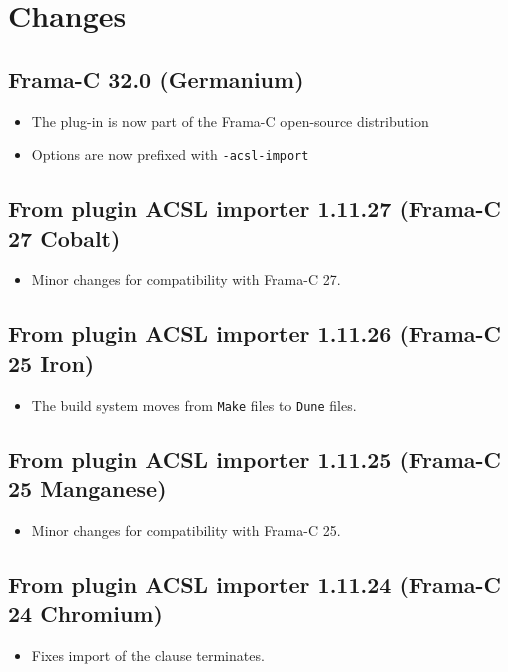 \chapter*{Changes}


\section*{Frama-C 32.0 (Germanium)}
\begin{itemize}
\item The plug-in is now part of the Frama-C open-source distribution
\item Options are now prefixed with \verb|-acsl-import|
\end{itemize}

\section*{From plugin ACSL importer 1.11.27 (Frama-C 27 Cobalt)}
\begin{itemize}
\item Minor changes for compatibility with Frama-C 27.
\end{itemize}

\section*{From plugin ACSL importer 1.11.26 (Frama-C 25 Iron)}
\begin{itemize}
\item The build system moves from \verb|Make| files to \verb|Dune| files.
\end{itemize}

\section*{From plugin ACSL importer 1.11.25 (Frama-C 25 Manganese)}
\begin{itemize}
\item Minor changes for compatibility with Frama-C 25.
\end{itemize}

\section*{From plugin ACSL importer 1.11.24 (Frama-C 24 Chromium)}
\begin{itemize}
\item Fixes import of the clause terminates.
\end{itemize}


